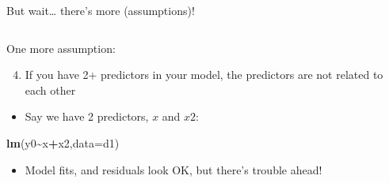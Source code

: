\documentclass[
  ignorenonframetext,
  aspectratio=169]{beamer}
\newenvironment{Shaded}{\begin{snugshade}}{\end{snugshade}}
\newcommand{\AttributeTok}[1]{\textcolor[rgb]{0.13,0.29,0.53}{#1}}
\newcommand{\FunctionTok}[1]{\textcolor[rgb]{0.13,0.29,0.53}{\textbf{#1}}}
\newcommand{\NormalTok}[1]{#1}
\newcommand{\SpecialCharTok}[1]{\textcolor[rgb]{0.81,0.36,0.00}{\textbf{#1}}}
\providecommand{\tightlist}{%
  \setlength{\itemsep}{0pt}\setlength{\parskip}{0pt}}
\let\oldShaded\Shaded %
\let\endoldShaded\endShaded
\renewenvironment{Shaded}{\scriptsize\oldShaded}{\endoldShaded}
\begin{document}
\begin{frame}[fragile]{But wait\ldots{} there's more (assumptions)!}
\protect\hypertarget{but-wait-theres-more-assumptions}{}
\begin{columns}[T]
\begin{column}{0.48\textwidth}
One more assumption:

\begin{enumerate}[<+->]
\setcounter{enumi}{3}
\tightlist
\item
  If you have 2+ predictors in your model, the predictors are not
  related to each other
\end{enumerate}

\begin{itemize}[<+->]
\tightlist
\item
  Say we have 2 predictors, \(x\) and \(x2\):
\end{itemize}

\begin{Shaded}
\begin{Highlighting}[]
\FunctionTok{lm}\NormalTok{(y0}\SpecialCharTok{\textasciitilde{}}\NormalTok{x}\SpecialCharTok{+}\NormalTok{x2,}\AttributeTok{data=}\NormalTok{d1)}
\end{Highlighting}
\end{Shaded}

\begin{itemize}[<+->]
\tightlist
\item
  Model fits, and residuals look OK, but there's trouble ahead!
\end{itemize}
\end{column}


\end{columns}
\end{frame}
\end{document}
